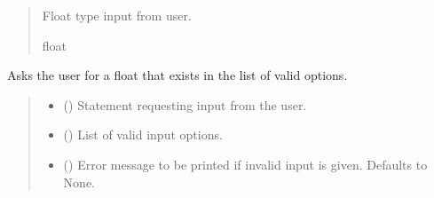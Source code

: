 \documentclass[letterpaper,10pt,english]{sphinxmanual}
\begin{document}
\begin{fulllineitems}
\begin{fulllineitems}
\begin{quote}
\begin{description}
\sphinxAtStartPar
Float type input from user.

\sphinxAtStartPar
float

\end{description}\end{quote}

\end{fulllineitems}


\begin{fulllineitems}
\label{\detokenize{GetUserInput:GetUserInput.UserInput.AskForFloatInList}}
\pysigstartsignatures
{}
\pysigstopsignatures
\sphinxAtStartPar
Asks the user for a float that exists in the list of valid options.
\begin{quote}\begin{description}
\begin{itemize}
\item {} 
\sphinxAtStartPar
{} () \textendash{} Statement requesting input from the user.

\item {} 
\sphinxAtStartPar
{} () \textendash{} List of valid input options.

\item {} 
\sphinxAtStartPar
{} (\sphinxstyleliteralemphasis{\sphinxupquote{ | }}\sphinxstyleliteralemphasis{\sphinxupquote{, }}) \textendash{} Error message to be printed if invalid input is given.                 Defaults to None.


\end{itemize}
\end{description}
\end{quote}
\end{fulllineitems}
\end{fulllineitems}
\end{document}
